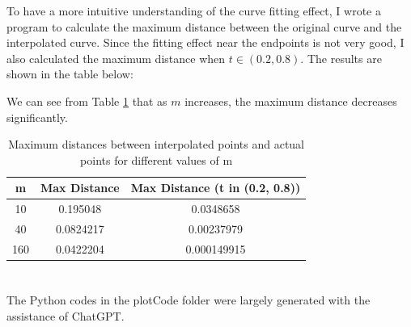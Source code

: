 \documentclass[a4paper]{article}
\begin{document}
To have a more intuitive understanding of the curve fitting effect, I wrote a program to calculate the maximum distance between the original curve and the interpolated curve. Since the fitting effect near the endpoints is not very good, I also calculated the maximum distance when \( t \in (0.2, 0.8) \). The results are shown in the table below:

We can see from Table \ref{tab:interpolation_distances} that as \( m \) increases, the maximum distance decreases significantly.
\begin{table}[H]
  \centering
  \begin{tabular}{|c|c|c|}
    \hline
    \textbf{m} & \textbf{Max Distance} & \textbf{Max Distance (t in (0.2, 0.8))} \\
    \hline
    10 & 0.195048 & 0.0348658 \\
    \hline
    40 & 0.0824217 & 0.00237979 \\
    \hline
    160 & 0.0422204 & 0.000149915 \\
    \hline
  \end{tabular}
  \caption{Maximum distances between interpolated points and actual points for different values of m}
  \label{tab:interpolation_distances}
\end{table}
\section*{  }
The Python codes in the plotCode folder were largely generated with the assistance of ChatGPT.
\end{document}

